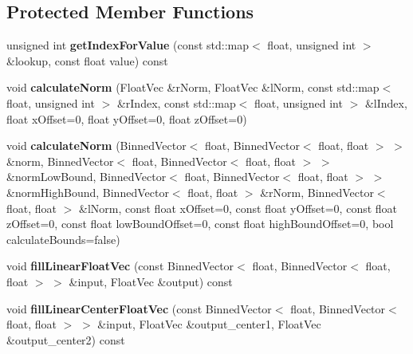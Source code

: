 \subsection*{Protected Member Functions}
\begin{DoxyCompactItemize}
\item 
unsigned int {\bfseries get\-Index\-For\-Value} (const std\-::map$<$ float, unsigned int $>$ \&lookup, const float value) const \label{classCALICE_1_1CalorimeterProfileProcessor_a2e904d60f12b437d8d963251e2620de9}

\item 
void {\bfseries calculate\-Norm} (Float\-Vec \&r\-Norm, Float\-Vec \&l\-Norm, const std\-::map$<$ float, unsigned int $>$ \&r\-Index, const std\-::map$<$ float, unsigned int $>$ \&l\-Index, float x\-Offset=0, float y\-Offset=0, float z\-Offset=0)\label{classCALICE_1_1CalorimeterProfileProcessor_acdd500419ed31f6605a0fc2983ab6a08}

\item 
void {\bfseries calculate\-Norm} (Binned\-Vector$<$ float, Binned\-Vector$<$ float, float $>$ $>$ \&norm, Binned\-Vector$<$ float, Binned\-Vector$<$ float, float $>$ $>$ \&norm\-Low\-Bound, Binned\-Vector$<$ float, Binned\-Vector$<$ float, float $>$ $>$ \&norm\-High\-Bound, Binned\-Vector$<$ float, float $>$ \&r\-Norm, Binned\-Vector$<$ float, float $>$ \&l\-Norm, const float x\-Offset=0, const float y\-Offset=0, const float z\-Offset=0, const float low\-Bound\-Offset=0, const float high\-Bound\-Offset=0, bool calculate\-Bounds=false)\label{classCALICE_1_1CalorimeterProfileProcessor_a5efb4ffaaaa2532f72e3fd4170c32e57}

\item 
void {\bfseries fill\-Linear\-Float\-Vec} (const Binned\-Vector$<$ float, Binned\-Vector$<$ float, float $>$ $>$ \&input, Float\-Vec \&output) const \label{classCALICE_1_1CalorimeterProfileProcessor_afead74966f6ed0eeedbfcf82f2576742}

\item 
void {\bfseries fill\-Linear\-Center\-Float\-Vec} (const Binned\-Vector$<$ float, Binned\-Vector$<$ float, float $>$ $>$ \&input, Float\-Vec \&output\-\_\-center1, Float\-Vec \&output\-\_\-center2) const \label{classCALICE_1_1CalorimeterProfileProcessor_a938047f4934d3127e5381eefe63bdd92}

\end{DoxyCompactItemize}
